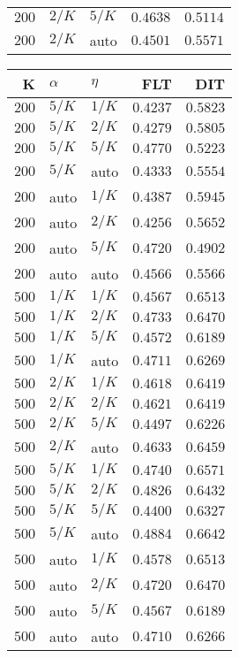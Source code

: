 \begin{table}
\begin{spacing}{1.2}
{\begin{tabular}{rll|rr}
$200$ &  $2/K$ &  $5/K$ &         $0.4638$ & $0.5114$ \\
$200$ &  $2/K$ &   auto &         $0.4501$ & $0.5571$ \\
\bottomrule
\end{tabular}
} \hfill \parbox{.45\linewidth}{\centering \begin{tabular}{rll|rr}
\toprule
    K &  $\alpha$ &    $\eta$ & FLT &        DIT \\
\midrule
$200$ &  $5/K$ &  $1/K$ &         $0.4237$ &      $0.5823$ \\
$200$ &  $5/K$ &  $2/K$ &         $0.4279$ &      $0.5805$ \\
$200$ &  $5/K$ &  $5/K$ &         $0.4770$ &      $0.5223$ \\
$200$ &  $5/K$ &   auto &         $0.4333$ &      $0.5554$ \\
$200$ &   auto &  $1/K$ &         $0.4387$ &      $0.5945$ \\
$200$ &   auto &  $2/K$ &         $0.4256$ &      $0.5652$ \\
$200$ &   auto &  $5/K$ &         $0.4720$ &      $0.4902$ \\
$200$ &   auto &   auto &         $0.4566$ &      $0.5566$ \\
$500$ &  $1/K$ &  $1/K$ &         $0.4567$ &      $0.6513$ \\
$500$ &  $1/K$ &  $2/K$ &         $0.4733$ &      $0.6470$ \\
$500$ &  $1/K$ &  $5/K$ &         $0.4572$ &      $0.6189$ \\
$500$ &  $1/K$ &   auto &         $0.4711$ &      $0.6269$ \\
$500$ &  $2/K$ &  $1/K$ &         $0.4618$ &      $0.6419$ \\
$500$ &  $2/K$ &  $2/K$ &         $0.4621$ &      $0.6419$ \\
$500$ &  $2/K$ &  $5/K$ &         $0.4497$ &      $0.6226$ \\
$500$ &  $2/K$ &   auto &         $0.4633$ &      $0.6459$ \\
$500$ &  $5/K$ &  $1/K$ &         $0.4740$ &      $0.6571$ \\
$500$ &  $5/K$ &  $2/K$ &         $0.4826$ &      $0.6432$ \\
$500$ &  $5/K$ &  $5/K$ &         $0.4400$ &      $0.6327$ \\
$500$ &  $5/K$ &   auto &    $\bm{0.4884}$ & $\bm{0.6642}$ \\
$500$ &   auto &  $1/K$ &         $0.4578$ &      $0.6513$ \\
$500$ &   auto &  $2/K$ &         $0.4720$ &      $0.6470$ \\
$500$ &   auto &  $5/K$ &         $0.4567$ &      $0.6189$ \\
$500$ &   auto &   auto &         $0.4710$ &      $0.6266$ \\
\bottomrule
\end{tabular}
}
\end{spacing}
\end{table}
